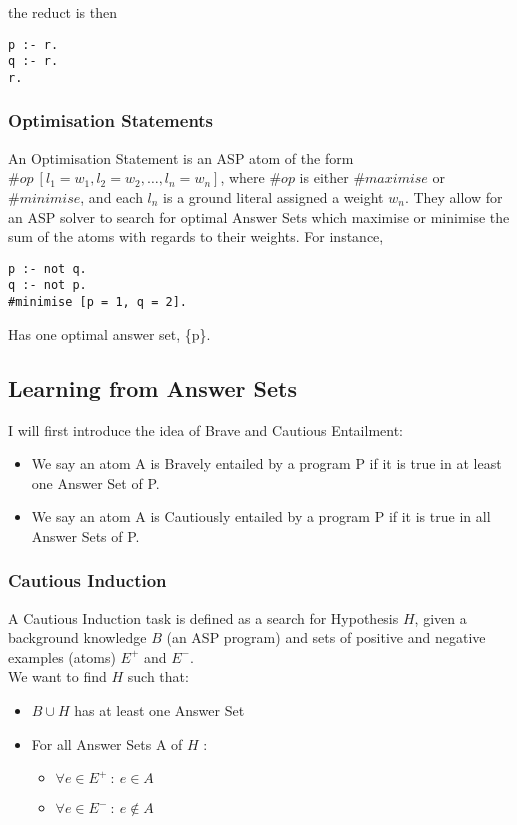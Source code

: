 the reduct is then

\begin{lstlisting}
p :- r.
q :- r.
r.
\end{lstlisting}

\subsubsection{Optimisation Statements}

An Optimisation Statement is an ASP atom of the form $ \#op \: [l_1 = w_1, l_2 = w_2, \dots, l_n = w_n]$, where $\#op$ is either $\#maximise$ or $\#minimise$, and each $l_n$ is a ground literal assigned a weight $w_n$. They allow for an ASP solver to search for optimal Answer Sets which maximise or minimise the sum of the atoms with regards to their weights. For instance, 

\begin{lstlisting}
p :- not q.
q :- not p.
#minimise [p = 1, q = 2].
\end{lstlisting}

Has one optimal answer set, \{p\}.

\subsection{Learning from Answer Sets}

I will first introduce the idea of Brave and Cautious Entailment:

\begin{itemize}
\item We say an atom A is Bravely entailed by a program P if it is true in at least one Answer Set of P.
\item We say an atom A is Cautiously entailed by a program P if it is true in all Answer Sets of P.
\end{itemize}

\subsubsection{Cautious Induction}

A Cautious Induction task is defined as a search for Hypothesis $H$, given a background knowledge $B$ (an ASP program) and sets of positive and negative examples (atoms) $E^+$ and $E^-$. \\

We want to find $H$ such that:

\begin{itemize}
\item $B \cup H$ has at least one Answer Set
\item For all Answer Sets A of $H$ :
\begin{itemize}
\item $\forall e \in E^+ \: : \: e \in A$
\item $\forall e \in E^- \: : \: e \not \in A$
\end{itemize}
\end{itemize}


